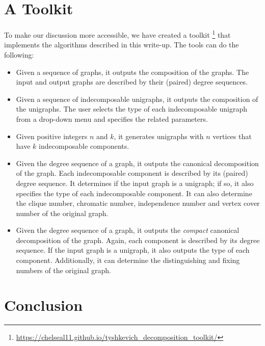 \documentclass[11pt]{article}
\begin{document}
\section{A Toolkit}
\label{sec6}

        To make our discussion more accessible, we have created a toolkit \footnote{\url{https://chelseal11.github.io/tyshkevich_decomposition_toolkit/}} that implements  the algorithms described in this write-up.  The tools can do the following:
        
\begin{itemize}
\item Given a  sequence of graphs, it outputs the composition of the graphs.  The input and output graphs are described by their (paired) degree sequences.

\item Given a sequence of indecomposable unigraphs, it outputs the composition of the unigraphs.  The user selects the type of each indecomposable unigraph from a drop-down menu and specifies the related parameters.

\item Given positive integers $n$ and $k$,  it generates unigraphs with $n$ vertices that have $k$ indecomposable components. 

\item Given the degree sequence of a graph, it outputs the canonical decomposition of the graph.  Each indecomposable component is described by its (paired) degree sequence.  It determines if the input graph is a unigraph; if so, it also specifies the type of each indecomposable component.  It can also determine the  clique number, chromatic number, independence number and vertex cover number of the original graph.

\item Given the degree sequence of a graph, it outputs the {\it compact} canonical decomposition of the graph.  Again, each component is described by its degree sequence.  If the input graph is a unigraph, it also outputs the type of each component.  Additionally, it can determine the distinguishing and fixing numbers of the original graph.

\end{itemize}        
       

\section{Conclusion}
\label{sec7}
\end{document}
